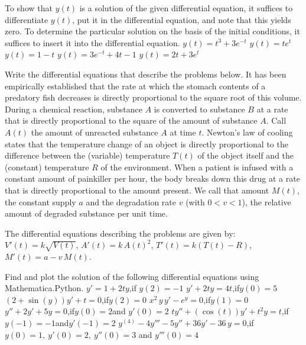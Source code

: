 \begin{Answer}\phantom{}  To show that $y(t)$ is a solution of the given differential equation, it suffices to differentiate $y(t)$, put it in the differential equation, and note that this yields zero.
To determine the particular solution on the basis of the initial conditions, it suffices to insert it into the differential equation.
	    \Question  $y(t) = t^3 + 3e^{-t}$
	    \Question $y(t) = te^t$
	    \Question $y(t) = 1 - t$
	    \Question $y(t) = 3e^{-t} + 4t - 1$
	    \Question $y(t) = 2t + 3e^t$
    \EndCurrentQuestion
\end{Answer}

\begin{Exercise}Write the differential equations that describe the problems below.
            \Question 
            It has been empirically established that the rate at which the stomach contents of a predatory fish decreases is directly proportional to the square root of this volume.
            \Question During a chemical reaction, substance $A$ is converted to substance $B$ at a rate that is directly proportional to the square of the amount of substance $A$. Call $A(t)$ the amount of unreacted substance $A$ at time $t$.
            \Question Newton's law of cooling states that the temperature change of an object is directly proportional to the difference between the (variable) temperature $T(t)$ of the object itself and the (constant) temperature $R$ of the environment.
            \Question When a patient is infused with a constant amount of painkiller per hour, the body breaks down this drug at a rate that is directly proportional to the amount present. We call that amount $M(t)$, the constant supply $a$ and the degradation rate $v$ (with $0< v < 1$), the relative amount of degraded substance per unit time.
            \EndCurrentQuestion
\end{Exercise}

\begin{Answer}\phantom{} The differential equations describing the problems are given by:
 	   \Question $V'(t) = k\sqrt{V(t)}$,
	   \Question $A'(t) = k\,A(t)^2$,
	   \Question $T'(t) = k\left(T(t) - R\right)$,
	   \Question $M'(t) = a - v\,M(t)$.
	   \EndCurrentQuestion
\end{Answer}

\begin{Exercise} Find and plot the solution of the following differential equations using
 \ifmathematica Mathematica.\fi \ifpython Python.\fi
    \Question $y'=1+2ty$,\qquad if \quad $y(2)=-1$ %
    \Question $y'+2ty=4t$,\qquad if\quad $y(0)=5$ %
    \Question $(2+\sin (y))y'+t=0$,\qquad if\quad $y(2)=0$ %
    \Question $x^2\,y\,y'-e^y=0$,\qquad if\quad $y\left(1\right)=0$ %
    \Question $y'' + 2y'+5y=0$,\qquad if\quad $y(0)=2$\quad and \quad $y'(0)=2$ %
    \Question $ty'' + \left(\cos(t)\right)y'+t^2y=t$,\qquad if\quad $y(-1)=-1$\quad and\quad $y'(-1)=2$ %
    \Question $y^{(4)}-4y'''-5y''+36y'-36\,y=0$,\qquad if\quad $y(0)=1,~y'(0)=2,~y''(0)=3$ and $y'''(0)=4$ %
    \EndCurrentQuestion
\end{Exercise}

